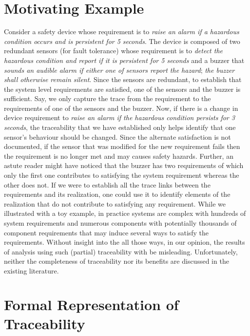 \section{Motivating Example}

Consider a safety device whose requirement is to \emph{raise an alarm if a hazardous condition occurs and is persistent for 5 seconds}. The device is composed of two redundant sensors (for fault tolerance) whose requirement is to \emph{detect the hazardous condition and report if it is persistent for 5 seconds} and a buzzer that \emph{sounds an audible alarm if either one of sensors report the hazard}; \emph{the buzzer shall otherwise remain silent}. Since the sensors are redundant, to establish that the system level requirements are satisfied, one of the sensors and the buzzer is sufficient. Say, we only capture the trace from the requirement to the requirements of one of the sensors and the buzzer. Now, if there is a change in device requirement to \emph{raise an alarm if the hazardous condition persists for 3 seconds}, the traceability that we have established only helps identify that one sensor's behaviour should be changed. Since the alternate satisfaction is not documented, if the sensor that was modified for the new requirement fails then the requirement is no longer met and may causes safety hazards. Further, an astute reader might have noticed that the buzzer has two requirements of which only the first one contributes to satisfying the system requirement whereas the other does not. If we were to establish all the trace links between the requirements and its realization, one could use it to identify elements of the realization that do not contribute to satisfying any requirement. While we illustrated with a toy example, in practice systems are complex with hundreds of system requirements and numerous components with potentially thousands of component requirements that may induce several ways to satisfy the requirements. Without insight into the all those ways, in our opinion, the results of analysis using such (partial) traceability with be misleading. Unfortunately, neither the completeness of traceability nor its benefits are discussed in the existing literature.

\section{Formal Representation of Traceability}
\label{sec:motivation}

